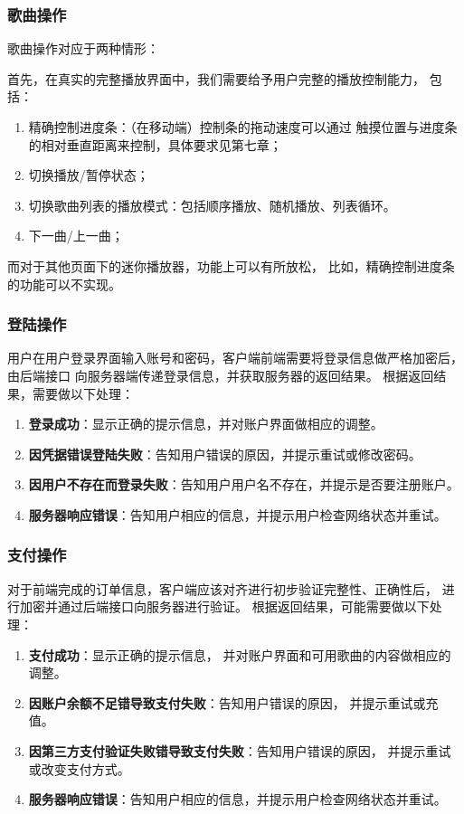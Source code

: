 \subsubsection{歌曲操作} %
\label{ssub:歌曲操作}
歌曲操作对应于两种情形：

首先，在真实的完整播放界面中，我们需要给予用户完整的播放控制能力，
包括：
\begin{enumerate}
    \item 精确控制进度条：（在移动端）控制条的拖动速度可以通过
    触摸位置与进度条的相对垂直距离来控制，具体要求见第七章；
    \item 切换播放/暂停状态；
    \item 切换歌曲列表的播放模式：包括顺序播放、随机播放、列表循环。
    \item 下一曲/上一曲；
\end{enumerate}

而对于其他页面下的迷你播放器，功能上可以有所放松，
比如，精确控制进度条的功能可以不实现。

\subsubsection{登陆操作} %
\label{ssub:登陆操作}
用户在用户登录界面输入账号和密码，客户端前端需要将登录信息做严格加密后，由后端接口
向服务器端传递登录信息，并获取服务器的返回结果。
根据返回结果，需要做以下处理：
\begin{enumerate}
    \item \textbf{登录成功}：显示正确的提示信息，并对账户界面做相应的调整。
    \item \textbf{因凭据错误登陆失败}：告知用户错误的原因，并提示重试或修改密码。
    \item \textbf{因用户不存在而登录失败}：告知用户用户名不存在，并提示是否要注册账户。
    \item \textbf{服务器响应错误}：告知用户相应的信息，并提示用户检查网络状态并重试。
\end{enumerate}

\subsubsection{支付操作} %
\label{ssub:支付操作}
对于前端完成的订单信息，客户端应该对齐进行初步验证完整性、正确性后，
进行加密并通过后端接口向服务器进行验证。
根据返回结果，可能需要做以下处理：
\begin{enumerate}
    \item \textbf{支付成功}：显示正确的提示信息，
        并对账户界面和可用歌曲的内容做相应的调整。
    \item \textbf{因账户余额不足错导致支付失败}：告知用户错误的原因，
        并提示重试或充值。
    \item \textbf{因第三方支付验证失败错导致支付失败}：告知用户错误的原因，
        并提示重试或改变支付方式。
    \item \textbf{服务器响应错误}：告知用户相应的信息，并提示用户检查网络状态并重试。
\end{enumerate}

